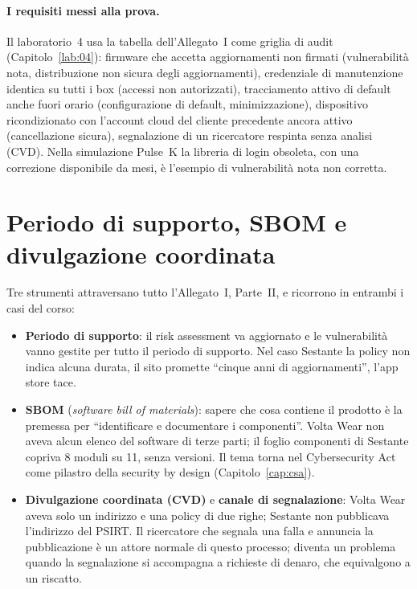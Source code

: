 \paragraph{I requisiti messi alla prova.} Il laboratorio~4 usa la tabella dell'Allegato~I come griglia
di audit (Capitolo~\ref{lab:04}): firmware che accetta aggiornamenti non firmati (vulnerabilità nota,
distribuzione non sicura degli aggiornamenti), credenziale di manutenzione identica su tutti i box
(accessi non autorizzati), tracciamento attivo di default anche fuori orario (configurazione di default,
minimizzazione), dispositivo ricondizionato con l'account cloud del cliente precedente ancora attivo
(cancellazione sicura), segnalazione di un ricercatore respinta senza analisi (CVD). Nella simulazione
Pulse~K la libreria di login obsoleta, con una correzione disponibile da mesi, è l'esempio di
vulnerabilità nota non corretta.

\section{Periodo di supporto, SBOM e divulgazione coordinata}
\label{sec:cra-supporto}

Tre strumenti attraversano tutto l'Allegato~I, Parte~II, e ricorrono in entrambi i casi del corso:
\begin{itemize}
  \item \textbf{Periodo di supporto}: il risk assessment va aggiornato e le vulnerabilità vanno gestite
    per tutto il periodo di supporto. Nel caso Sestante la policy non indica alcuna durata, il sito
    promette ``cinque anni di aggiornamenti'', l'app store tace.
  \item \textbf{SBOM} (\emph{software bill of materials}): sapere che cosa contiene il prodotto è la
    premessa per ``identificare e documentare i componenti''. Volta Wear non aveva alcun elenco del
    software di terze parti; il foglio componenti di Sestante copriva 8 moduli su 11, senza versioni. Il
    tema torna nel Cybersecurity Act come pilastro della security by design (Capitolo~\ref{cap:csa}).
  \item \textbf{Divulgazione coordinata (CVD)} e \textbf{canale di segnalazione}: Volta Wear aveva solo un
    indirizzo e una policy di due righe; Sestante non pubblicava l'indirizzo del PSIRT. Il ricercatore
    che segnala una falla e annuncia la pubblicazione è un attore normale di questo processo; diventa un
    problema quando la segnalazione si accompagna a richieste di denaro, che equivalgono a un riscatto.
\end{itemize}


